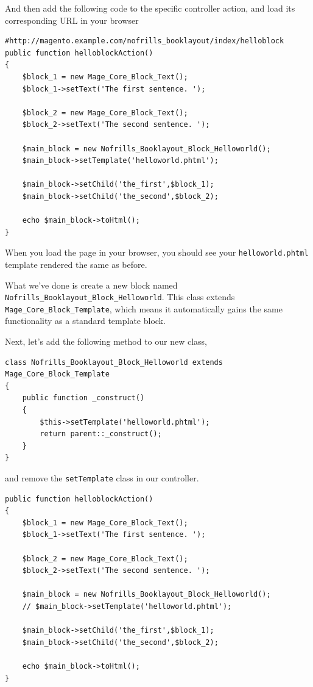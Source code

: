 \documentclass[oneside]{book}
\begin{document}
And then add the following code to the specific controller action, and load its corresponding URL in your browser

\begin{lstlisting}
#http://magento.example.com/nofrills_booklayout/index/helloblock
public function helloblockAction()
{
    $block_1 = new Mage_Core_Block_Text();
    $block_1->setText('The first sentence. ');

    $block_2 = new Mage_Core_Block_Text();
    $block_2->setText('The second sentence. ');

    $main_block = new Nofrills_Booklayout_Block_Helloworld();
    $main_block->setTemplate('helloworld.phtml');

    $main_block->setChild('the_first',$block_1);
    $main_block->setChild('the_second',$block_2);

    echo $main_block->toHtml();
}

\end{lstlisting}


When you load the page in your browser, you should see your \footnotesize\texttt{helloworld.phtml} \normalsize  template rendered the same as before.

What we've done is create a new block named \footnotesize\texttt{Nofrills\_Booklayout\_Block\_Helloworld}\normalsize. This class extends \footnotesize\texttt{Mage\_Core\_Block\_Template}\normalsize, which means it automatically gains the same functionality as a standard template block.

Next, let's add the following method to our new class,

\begin{lstlisting}
class Nofrills_Booklayout_Block_Helloworld extends Mage_Core_Block_Template
{
    public function _construct()
    {
        $this->setTemplate('helloworld.phtml');
        return parent::_construct();
    }
}

\end{lstlisting}


and remove the \footnotesize\texttt{setTemplate} \normalsize  class in our controller.

\begin{lstlisting}
public function helloblockAction()
{
    $block_1 = new Mage_Core_Block_Text();
    $block_1->setText('The first sentence. ');

    $block_2 = new Mage_Core_Block_Text();
    $block_2->setText('The second sentence. ');

    $main_block = new Nofrills_Booklayout_Block_Helloworld();
    // $main_block->setTemplate('helloworld.phtml');

    $main_block->setChild('the_first',$block_1);
    $main_block->setChild('the_second',$block_2);

    echo $main_block->toHtml();
}

\end{lstlisting}
\end{document}
